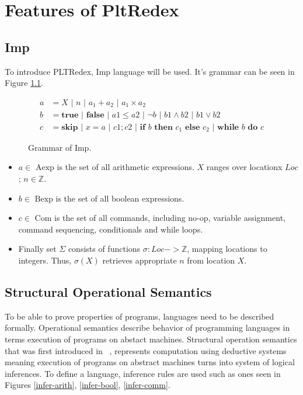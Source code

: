 \chapter{Features of PltRedex}

\section{Imp}

To introduce PLTRedex, Imp language will be used. It's grammar can be seen in Figure \ref{imp-grammar}.

\begin{figure}[h]
\begin{align*}
a &= X \text{ | } n \text{ | } a_1 + a_2 \text{ | } a_1 \times a_2 \\
b &= \textbf{true} \text{ | } \textbf{false} \text{ | } a1 \leq a2 \text{ | } \neg b \text{ | } b1 \land b2 \text{ | } b1 \lor b2 \\
c &= \textbf{skip} \text{ | } x = a \text{ | } c1; c2 \text{ | } \textbf{if } b \textbf{ then } c_1 \textbf{ else } c_2 \text{ | } \textbf{while } b \textbf{ do } c
\end{align*}
\caption{Grammar of Imp.}
\label{imp-grammar}
\end{figure}

\begin{itemize}
\item $a \in \text{ Aexp}$ is the set of all arithmetic expressions. $X$ ranges over locationx $Loc$; $n \in \mathbb{Z}$.
\item $b \in \text{ Bexp}$ is the set of all boolean expressions.
\item $c \in \text{ Com}$ is the set of all commands, including no-op, variable assignment, command sequencing, conditionals and while loops.
\item Finally set $\Sigma$ consists of functions $\sigma: Loc -> \mathbb{Z}$, mapping locations to integers. Thus, $\sigma(X)$ retrieves appropriate $n$ from location $X$.
\end{itemize}


\section{Structural Operational Semantics}
To be able to prove properties of programs, languages need to be described formally. Operational semantics describe behavior of programming languages in terms execution of programs on abstact machines. Structural operation semantics that was first introduced in ~\cite{plotkin}, represents computation using deductive systems meaning execution of programs on abstract machines turns into system of logical inferences. To define a language, inference rules are used such as ones seen in Figures \ref{infer-arith}, \ref{infer-bool}, \ref{infer-comm}.

